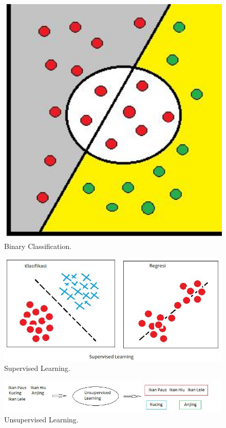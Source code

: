 \begin{figure}[ht]
		\centerline{\includegraphics[width=1\textwidth]{figures/huda/binary.JPG}}
		\caption{Binary Classification.}
		\label{1}
\end{figure}
\begin{figure}[ht]
		\centerline{\includegraphics[width=1\textwidth]{figures/huda/supervised.JPG}}
		\caption{Supervised Learning.}
		\label{2}
\end{figure}
\begin{figure}[ht]
		\centerline{\includegraphics[width=1\textwidth]{figures/huda/unsupervised.JPG}}
		\caption{Unsupervised Learning.}
		\label{3}
\end{figure}
